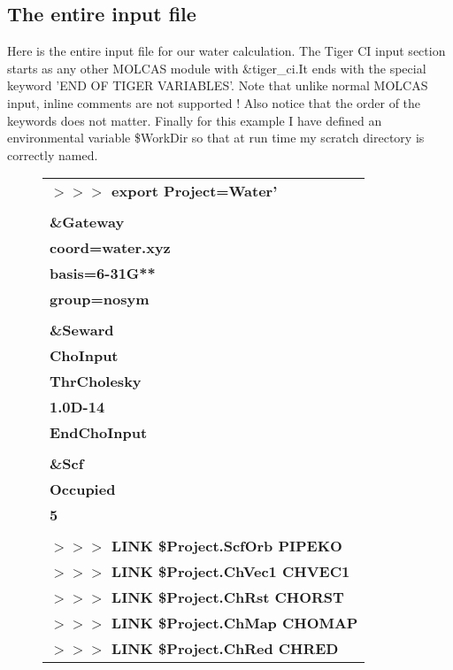 \documentclass{article}
\begin{document}
\clearpage
\subsection{The entire input file}

Here is the entire input file for our water calculation. The Tiger CI input section starts as any other MOLCAS module with \&tiger\_ci.It ends with the special keyword 'END OF TIGER VARIABLES'. Note that unlike normal MOLCAS input, inline comments are not supported ! Also notice that the order of the keywords does not matter. Finally for this example I have defined an environmental variable \$WorkDir so that at run time my scratch directory is correctly named.   

\begin{figure}[h!]
	\begin{tabular}{l}
	        \textbf{$>>>$ export Project=Water'} \\
	        \textbf{ } \\
		\textbf{\&Gateway} \\
		\textbf{coord=water.xyz} \\
		\textbf{basis=6-31G**} \\
		\textbf{group=nosym} \\
		\textbf{ } \\
		\textbf{\&Seward} \\
		\textbf{ChoInput} \\
		\textbf{ThrCholesky} \\
		\textbf{1.0D-14} \\
		\textbf{EndChoInput} \\
		\textbf{ } \\
		\textbf{\&Scf} \\
		\textbf{Occupied} \\
		\textbf{5} \\
		\textbf{ } \\
		\textbf{$>>>$ LINK \$Project.ScfOrb PIPEKO} \\
		\textbf{$>>>$ LINK \$Project.ChVec1 CHVEC1} \\
		\textbf{$>>>$ LINK \$Project.ChRst CHORST} \\
		\textbf{$>>>$ LINK \$Project.ChMap CHOMAP} \\
		\textbf{$>>>$ LINK \$Project.ChRed CHRED} \\
	\end{tabular}
	\centering
\end{figure}
\end{document}
